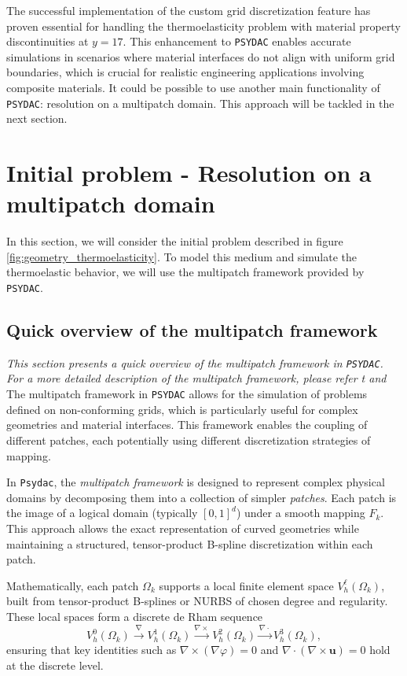 \documentclass[a4paper,12pt,twoside]{report}
\begin{document}
The successful implementation of the custom grid discretization feature has proven essential for handling the thermoelasticity problem with material property discontinuities at $y = 17$. This enhancement to \texttt{PSYDAC} enables accurate simulations in scenarios where material interfaces do not align with uniform grid boundaries, which is crucial for realistic engineering applications involving composite materials. It could be possible to use another main functionality of \texttt{PSYDAC}: resolution on a multipatch domain. This approach will be tackled in the next section. 

\section{Initial problem - Resolution on a multipatch domain}

In this section, we will consider the initial problem described in figure \ref{fig:geometry_thermoelasticity}. To model this medium and simulate the thermoelastic behavior, we will use the multipatch framework provided by \texttt{PSYDAC}.

\subsection{Quick overview of the multipatch framework}
\textit{This section presents a quick overview of the multipatch framework in \texttt{PSYDAC}. For a more detailed description of the multipatch framework, please refer t \cite{guclu_psydac_2022} and \cite{Guclu2023}} \\

The multipatch framework in \texttt{PSYDAC} allows for the simulation of problems defined on non-conforming grids, which is particularly useful for complex geometries and material interfaces. This framework enables the coupling of different patches, each potentially using different discretization strategies of mapping.

In \texttt{Psydac}, the \emph{multipatch framework} is designed to represent complex physical domains by decomposing them into a collection of simpler \emph{patches}. Each patch is the image of a logical domain (typically $[0,1]^d$) under a smooth mapping $F_k$. This approach allows the exact representation of curved geometries while maintaining a structured, tensor-product B-spline discretization within each patch.

Mathematically, each patch $\Omega_k$ supports a local finite element space $V_h^\ell(\Omega_k)$, built from tensor-product B-splines or NURBS of chosen degree and regularity. These local spaces form a discrete de Rham sequence
\[
V_h^0(\Omega_k) \xrightarrow{\nabla} V_h^1(\Omega_k) \xrightarrow{\nabla \times} V_h^2(\Omega_k) \xrightarrow{\nabla \cdot} V_h^3(\Omega_k),
\]
ensuring that key identities such as $\nabla \times (\nabla \varphi) = 0$ and $\nabla \cdot (\nabla \times \mathbf{u}) = 0$ hold at the discrete level.
\end{document}
